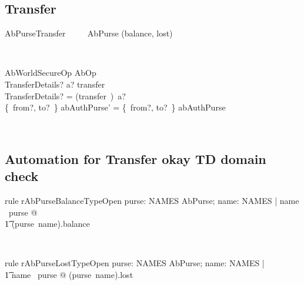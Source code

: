 \subsection{Transfer}

\begin{LSDef}
\begin{zed}
  AbPurseTransfer ~~~~ AbPurse \hide (balance, lost)
\end{zed}~\end{LSDef}

\begin{LSDef}
\begin{schema}{AbWorldSecureOp}
  AbOp\\
  TransferDetails?
\where
  a? \in  \ran  transfer\\
  \theta  TransferDetails? = (transfer~\inv)~a?\\
  \{~from?, to?~\} \ndres  abAuthPurse' = \{~from?, to?~\} \ndres  abAuthPurse
\end{schema}~\end{LSDef}

\subsection*{Automation for Transfer okay TD domain check}


\begin{LRRT}
\begin{theorem}{rule rAbPurseBalanceTypeOpen}
    \forall  purse: NAMES \ffun AbPurse; name: NAMES | name \in \dom~purse @ \\
        \t1 (purse~name).balance \in \nat
\end{theorem}~\end{LRRT}

\begin{LRRT}
\begin{theorem}{rule rAbPurseLostTypeOpen}
   \forall purse: NAMES \ffun AbPurse; name: NAMES | \\
      \t1 name \in \dom~purse @ (purse~name).lost \in \nat
\end{theorem}~\end{LRRT}

